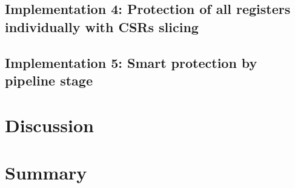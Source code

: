 \subsection{Implementation 4: Protection of all registers individually with CSRs slicing}

\subsection{Implementation 5: Smart protection by pipeline stage}


\section{Discussion}


\section{Summary}


